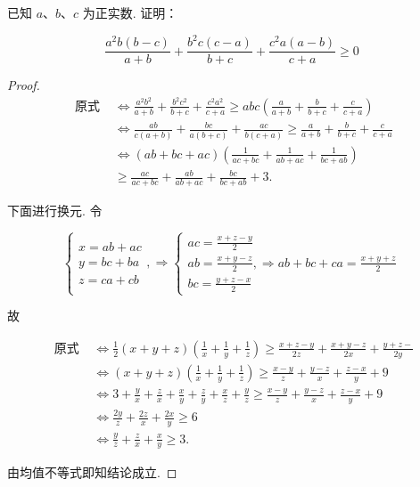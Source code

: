\begin{example}
	已知 $a 、 b 、 c$ 为正实数. 证明：
	
	$$
	\frac{a^{2} b(b-c)}{a+b}+\frac{b^{2} c(c-a)}{b+c}+\frac{c^{2} a(a-b)}{c+a} \geqslant 0
	$$
\end{example}
	\begin{proof}
	$$
	\begin{aligned}
	\text { 原式 } & \Leftrightarrow \frac{a^{2} b^{2}}{a+b}+\frac{b^{2} c^{2}}{b+c}+\frac{c^{2} a^{2}}{c+a} \geqslant a b c\left(\frac{a}{a+b}+\frac{b}{b+c}+\frac{c}{c+a}\right) \\
	& \Leftrightarrow \frac{a b}{c(a+b)}+\frac{b c}{a(b+c)}+\frac{a c}{b(c+a)} \geqslant \frac{a}{a+b}+\frac{b}{b+c}+\frac{c}{c+a} \\
	& \Leftrightarrow(a b+b c+a c)\left(\frac{1}{a c+b c}+\frac{1}{a b+a c}+\frac{1}{b c+a b}\right) \\
	& \geqslant \frac{a c}{a c+b c}+\frac{a b}{a b+a c}+\frac{b c}{b c+a b}+3 .
	\end{aligned}
	$$
	
	下面进行换元. 令
	
	$$
	\left\{\begin{array}{l}
	x=a b+a c \\
	y=b c+b a \\
	z=c a+c b
	\end{array}, \Rightarrow\left\{\begin{array}{l}
	a c=\frac{x+z-y}{2} \\
	a b=\frac{x+y-z}{2}, \Rightarrow a b+b c+c a=\frac{x+y+z}{2} \\
	b c=\frac{y+z-x}{2}
	\end{array}\right.\right.
	$$
	
	故
	
	$$
	\begin{aligned}
	\text { 原式 } & \Leftrightarrow \frac{1}{2}(x+y+z)\left(\frac{1}{x}+\frac{1}{y}+\frac{1}{z}\right) \geqslant \frac{x+z-y}{2 z}+\frac{x+y-z}{2 x}+\frac{y+z-}{2 y} \\
	& \Leftrightarrow(x+y+z)\left(\frac{1}{x}+\frac{1}{y}+\frac{1}{z}\right) \geqslant \frac{x-y}{z}+\frac{y-z}{x}+\frac{z-x}{y}+9 \\
	& \Leftrightarrow 3+\frac{y}{x}+\frac{z}{x}+\frac{x}{y}+\frac{z}{y}+\frac{x}{z}+\frac{y}{z} \geqslant \frac{x-y}{z}+\frac{y-z}{x}+\frac{z-x}{y}+9 \\
	& \Leftrightarrow \frac{2 y}{z}+\frac{2 z}{x}+\frac{2 x}{y} \geqslant 6 \\
	& \Leftrightarrow \frac{y}{z}+\frac{z}{x}+\frac{x}{y} \geqslant 3 .
	\end{aligned}
	$$
	
	由均值不等式即知结论成立.
\end{proof}
